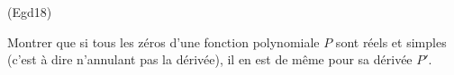 \begin{tiny}(Egd18)\end{tiny} Montrer que si tous les zéros d'une fonction polynomiale $P$ sont réels et simples (c'est à dire n'annulant pas la dérivée), il en est de même pour sa dérivée $P'$.

 